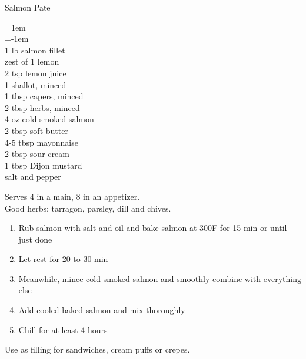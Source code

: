 \documentclass{article}
\newenvironment{recipe}[2]
    {\clearpage
    \begin{FlushLeft}
    \textrm{{\large#1}\hfill{\large\tabularnums{#2}}}
    \vspace{0.5em}
    \columnratio{0.333}
    \setlength{\columnsep}{0.2in}
    \begin{paracol}{2}}
    {\end{paracol}\end{FlushLeft}}
\newenvironment{denserecipe}[2]
    {\small
    \begin{recipe}{#1}{#2}}
    {\end{recipe}}
\newcommand{\nextcolumn}{\switchcolumn}
\newenvironment{ingredients}
    {
    \begin{obeylines}
    \vspace{\parskip}
    \setlength{\parskip}{0.25em}
    \vspace{-0.25em}
    \leftskip=1em
    \parindent=-1em}
    {\end{obeylines}}
\newenvironment{steps}
    {\begin{enumerate}[leftmargin=*,topsep=0pt]}
    {\end{enumerate}}
\newcommand{\fahrenheit}[1]{#1\textdegree{}F}
\newcommand{\tag}[1]{\hspace{1em}#1}
\newcommand{\symboltag}[2]{\tag{#1\hspace{0.4em}#2}}
\newcommand{\totaltime}[1]{\symboltag{\raisebox{-0.1em}{\small\StopWatchEnd}}{#1}}
\begin{document}
\begin{denserecipe}{Salmon Pate}{\fahrenheit{300}\totaltime{50 min}}
\begin{ingredients}
1 lb salmon fillet
zest of 1 lemon
2 tsp lemon juice
1 shallot, minced
1 tbsp capers, minced
2 tbsp herbs, minced
4 oz cold smoked salmon
2 tbsp soft butter
4-5 tbsp mayonnaise
2 tbsp sour cream
1 tbsp Dijon mustard
salt and pepper
\end{ingredients}
\nextcolumn
Serves 4 in a main, 8 in an appetizer. \\
Good herbs: tarragon, parsley, dill and chives.
\begin{steps}
\item Rub salmon with salt and oil and bake salmon at \fahrenheit{300} for 15 min or until just done
\item Let rest for 20 to 30 min
\item Meanwhile, mince cold smoked salmon and smoothly combine with everything else
\item Add cooled baked salmon and mix thoroughly
\item Chill for at least 4 hours
\end{steps}
Use as filling for sandwiches, cream puffs or crepes. 
\end{denserecipe}
\end{document}
